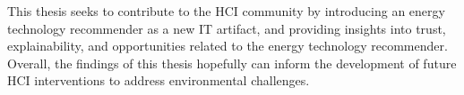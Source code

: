 

This thesis seeks to contribute to the HCI community by 
introducing an energy technology recommender as a new IT artifact, 
and providing insights into trust, explainability, and opportunities related to the energy technology recommender. 
Overall, the findings of this thesis hopefully can inform the development of future HCI interventions to address environmental challenges. 






